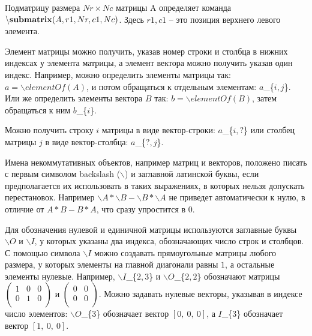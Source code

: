 Подматрицу размера $Nr\times Nc$ матрицы A определяет команда $\backslash {\bf submatrix}( A,r1,Nr,c1,Nc)$. 
Здесь $r1,c1$ -- это позиция верхнего левого элемента.

Элемент матрицы можно получить,  указав номер строки и столбца в нижних индексах у элемента матрицы, 
а элемент вектора можно получить указав один индекс. Например,
можно определить элементы матрицы так: $a=\backslash elementOf(A)$, и потом обращаться к отдельным элементам: $a$\_\{$i, j$\}. 
Или же определить элементы вектора $B$ так: 
$b=\backslash elementOf(B)$, затем обращаться к ним $b$\_\{$i$\}.  

Можно получить строку $i$ матрицы в виде вектор-строки: $a$\_\{$i, ?$\} или столбец матрицы $j$ в виде вектор-столбца:  
   $a$\_\{$?, j$\}.  
 
Имена некоммутативных объектов,  например матриц и векторов, положено писать 
с первым символом backslash ($\backslash$) и заглавной латинской буквы, если предполагается их использовать в таких выражениях, 
в которых нельзя допускать перестановок. Например $\backslash A *\backslash B  - \backslash B *\backslash A$ не приведет автоматически к нулю, 
в отличие от $A *B - B *A$, что сразу упростится в 0.

Для обозначения нулевой и единичной матрицы используются заглавные буквы $\backslash O$ и $\backslash I$,  
у которых указаны два индекса,  обозначающих число строк и столбцов.  
С помощью символа $\backslash I$ можно создавать прямоугольные матрицы любого размера,  
у которых элементы на главной диагонали равны $1$,  а остальные элементы нулевые. 
Например,  $\backslash I$\_\{$2, 3$\} и $\backslash O$\_\{$2, 2$\} обозначают матрицы $\left(\begin{array}{ccc}
1&0&0\\
0&1&0\\                                                                                                                                                                                                                                                                                                                                                                          \end{array}\right)$ и $\left(\begin{array}{cc}
0&0\\
0&0\\                                                                                                                                                                                                                                                                                                                                                                          \end{array}\right)$. Можно задавать нулевые векторы,  указывая в индексе число элементов: $\backslash O$\_\{$3$\} обозначает вектор $[0,\ 0,\ 0]$,  а $I$\_\{$3$\} обозначает вектор $[1,\ 0,\ 0]$.  

